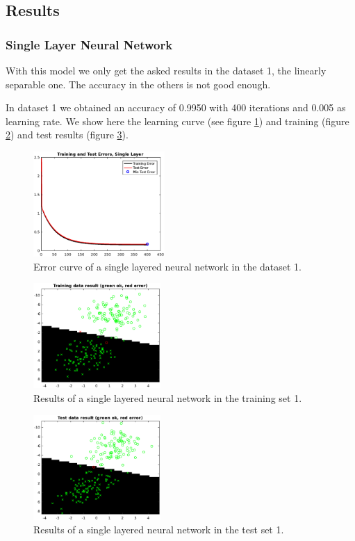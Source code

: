 \documentclass{article}
\begin{document}
\subsection{Results}

\subsubsection{Single Layer Neural Network}

With this model we only get the asked results in the dataset 1, the linearly separable one. The accuracy in the others is not good enough.

In dataset 1 we obtained an accuracy of 0.9950 with 400 iterations and 0.005 as learning rate. We show here the learning curve (see figure \ref{fig:single_data1_error}) and training (figure \ref{fig:single_data1_result_train}) and test results (figure \ref{fig:single_data1_result_test}).

\begin{figure}[H]
\centering
\includegraphics[height=4cm]{images/single_data1_error}
\caption{Error curve of a single layered neural network in the dataset 1.}
\label{fig:single_data1_error}
\end{figure}

\begin{figure}[H]
\centering
\includegraphics[height=4cm]{images/single_data1_result_train}
\caption{Results of a single layered neural network in the training set 1.}
\label{fig:single_data1_result_train}
\end{figure}

\begin{figure}[H]
\centering
\includegraphics[height=4cm]{images/single_data1_result_test}
\caption{Results of a single layered neural network in the test set 1.}
\label{fig:single_data1_result_test}
\end{figure}
\end{document}
